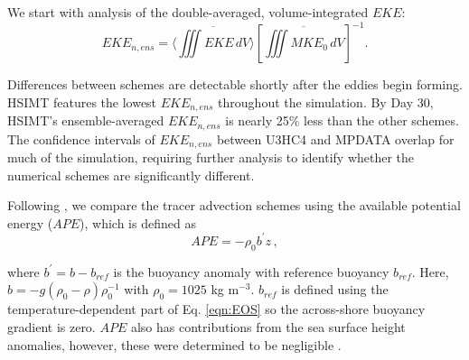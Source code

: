 We start with analysis of the double-averaged, volume-integrated $EKE$: 
\begin{equation}
    EKE_{n,ens} = \langle \overline{\iiint EKE \, dV }\rangle \left[\overline{\iiint MKE_0 \, dV}\right]^{-1}.
\end{equation}

Differences between schemes are detectable shortly after the eddies begin forming. HSIMT features the lowest $EKE_{n,ens}$ throughout the simulation. By Day 30, HSIMT's ensemble-averaged $EKE_{n,ens}$ is nearly 25\% less than the other schemes. The confidence intervals of $EKE_{n,ens}$ between U3HC4 and MPDATA overlap for much of the simulation, requiring further analysis to identify whether the numerical schemes are significantly different. 

Following \citet{Hetland_2017}, we compare the tracer advection schemes using the available potential energy ($APE$), which is defined as 
\begin{equation}
    APE = -\rho_0 b^\prime z \, , 
\end{equation}

where $b^\prime = b-b_{ref}$ is the buoyancy anomaly with reference buoyancy $b_{ref}$. Here, $b = -g(\rho_{0}-\rho)\rho_0^{-1}$ with $\rho_0=1025$ kg m$^{-3}$. $b_{ref}$ is defined using the temperature-dependent part of Eq. \ref{eqn:EOS} so the across-shore buoyancy gradient is zero. $APE$ also has contributions from the sea surface height anomalies, however, these were determined to be negligible \cite[not shown, see Appendix B of][]{Hetland_2017}. %

